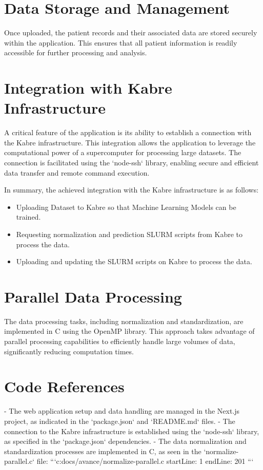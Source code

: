 \documentclass[a4paper,12pt]{report}
\begin{document}
\section{Data Storage and Management}
Once uploaded, the patient records and their associated data are stored securely within the application. This ensures that all patient information is readily accessible for further processing and analysis.

\section{Integration with Kabre Infrastructure}
A critical feature of the application is its ability to establish a connection with the Kabre infrastructure. This integration allows the application to leverage the computational power of a supercomputer for processing large datasets. The connection is facilitated using the `node-ssh` library, enabling secure and efficient data transfer and remote command execution.

In summary, the achieved integration with the Kabre infrastructure is as follows:

\begin{itemize}
    \item Uploading Dataset to Kabre so that Machine Learning Models can be trained.
    \item Requesting normalization and prediction SLURM scripts from Kabre to process the data.
    \item Uploading and updating the SLURM scripts on Kabre to process the data.
\end{itemize}

\section{Parallel Data Processing}
The data processing tasks, including normalization and standardization, are implemented in C using the OpenMP library. This approach takes advantage of parallel processing capabilities to efficiently handle large volumes of data, significantly reducing computation times.

\section{Code References}
- The web application setup and data handling are managed in the Next.js project, as indicated in the `package.json` and `README.md` files.
- The connection to the Kabre infrastructure is established using the `node-ssh` library, as specified in the `package.json` dependencies.
- The data normalization and standardization processes are implemented in C, as seen in the `normalize-parallel.c` file:
  ```c:docs/avance/normalize-parallel.c
  startLine: 1
  endLine: 201
  ```
\end{document}
